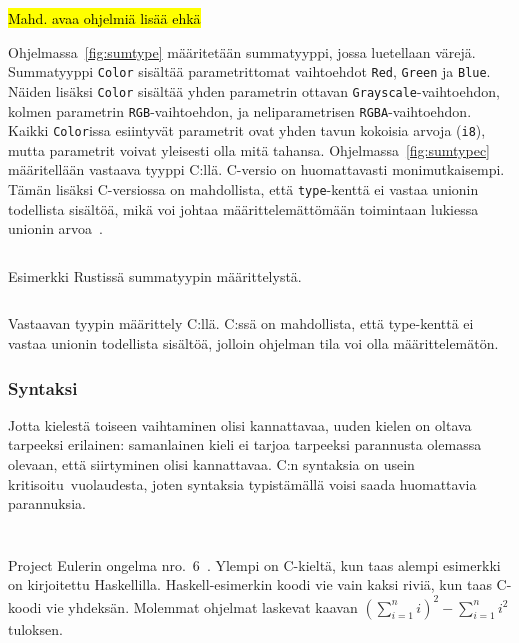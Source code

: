 \hl{Mahd. avaa ohjelmiä lisää ehkä}

Ohjelmassa~\ref{fig:sumtype} määritetään summatyyppi, jossa luetellaan värejä.
Summatyyppi \texttt{Color} sisältää parametrittomat vaihtoehdot \texttt{Red},
\texttt{Green} ja \texttt{Blue}. Näiden lisäksi \texttt{Color} sisältää yhden
parametrin ottavan \texttt{Grayscale}-vaihtoehdon, kolmen parametrin
\texttt{RGB}-vaihtoehdon, ja neliparametrisen \texttt{RGBA}-vaihtoehdon. Kaikki
\texttt{Color}issa esiintyvät parametrit ovat yhden tavun kokoisia arvoja
(\texttt{i8}), mutta parametrit voivat yleisesti olla mitä tahansa.
Ohjelmassa~\ref{fig:sumtypec} määritellään vastaava tyyppi C:llä. C-versio on
huomattavasti monimutkaisempi. Tämän lisäksi C-versiossa on mahdollista, että
\texttt{type}-kenttä ei vastaa unionin todellista sisältöä, mikä voi johtaa
määrittelemättömään toimintaan lukiessa unionin arvoa~\citep[luku
6.7.2.1]{C18}.

\begin{listing}[ht!]
    \inputminted{Rust}{sumtype.rs}
    \caption{Esimerkki Rustissä summatyypin määrittelystä.}
    \label{fig:sumtype}
\end{listing}

\begin{listing}[ht!]
    \inputminted{C}{sumtype.c}
    \caption{Vastaavan tyypin määrittely C:llä. C:ssä on mahdollista, että
    type-kenttä ei vastaa unionin todellista sisältöä, jolloin ohjelman tila
    voi olla määrittelemätön.}
    \label{fig:sumtypec}
\end{listing}

\FloatBarrier


\subsubsection{Syntaksi}

Jotta kielestä toiseen vaihtaminen olisi kannattavaa, uuden kielen on oltava
tarpeeksi erilainen: samanlainen kieli ei tarjoa tarpeeksi parannusta
olemassa olevaan, että siirtyminen olisi kannattavaa. C:n syntaksia on usein
kritisoitu\citationneeded~vuolaudesta, joten syntaksia typistämällä voisi saada
huomattavia parannuksia.

\begin{listing}[ht!]
    \inputminted{C}{squaresum.c}
    \inputminted{Haskell}{squaresum.hs}
    \caption{Project Eulerin ongelma nro.\ 6~\citep{euler}. Ylempi on
    C-kieltä, kun taas alempi esimerkki on kirjoitettu Haskellilla.
    Haskell-esimerkin koodi vie vain kaksi riviä, kun taas C-koodi vie
    yhdeksän. Molemmat ohjelmat laskevat kaavan
    $(\sum\limits_{i=1}^n i)^2 - \sum\limits_{i=1}^n i^2$ tuloksen.
    }
    \label{fig:strcmp}
\end{listing}

